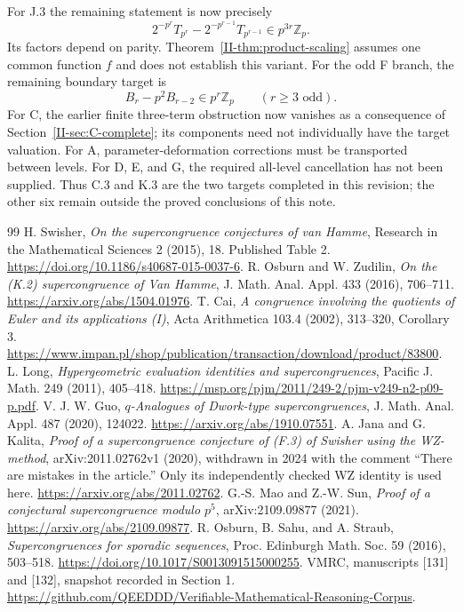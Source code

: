 \documentclass[11pt,letterpaper]{article}
\numberwithin{equation}{section}
\begin{document}
For J.3 the remaining statement is now precisely
\[
2^{-p^r}T_{p^r}-2^{-p^{r-1}}T_{p^{r-1}}
\in p^{3r}\mathbb Z_p.
\]
Its factors depend on parity. Theorem~\ref{II-thm:product-scaling}
assumes one common function $f$ and does not establish this variant.
For the odd F branch, the remaining boundary target is
\[
B_r-p^2B_{r-2}\in p^r\mathbb Z_p\qquad(r\ge3\text{ odd}).
\]
For C, the earlier finite three-term obstruction now vanishes as a
consequence of Section~\ref{II-sec:C-complete}; its components need not
individually have the target valuation.
For A, parameter-deformation corrections must be transported between
levels. For D, E, and G, the required all-level cancellation has not
been supplied. Thus C.3 and K.3 are the two targets completed in this
revision; the other six remain outside the proved conclusions of this note.

\begin{thebibliography}{99}
 H. Swisher, \emph{On the supercongruence conjectures
of van Hamme}, Research in the Mathematical Sciences 2 (2015), 18.
Published Table 2. \url{https://doi.org/10.1186/s40687-015-0037-6}.
 R. Osburn and W. Zudilin, \emph{On the (K.2)
supercongruence of Van Hamme}, J. Math. Anal. Appl. 433 (2016), 706--711.
\url{https://arxiv.org/abs/1504.01976}.
 T. Cai, \emph{A congruence involving the quotients of
Euler and its applications (I)}, Acta Arithmetica 103.4 (2002), 313--320,
Corollary 3. \url{https://www.impan.pl/shop/publication/transaction/download/product/83800}.
 L. Long, \emph{Hypergeometric evaluation identities
and supercongruences}, Pacific J. Math. 249 (2011), 405--418.
\url{https://msp.org/pjm/2011/249-2/pjm-v249-n2-p09-p.pdf}.
 V. J. W. Guo, \emph{$q$-Analogues of Dwork-type
supercongruences}, J. Math. Anal. Appl. 487 (2020), 124022.
\url{https://arxiv.org/abs/1910.07551}.
 A. Jana and G. Kalita, \emph{Proof of a
supercongruence conjecture of (F.3) of Swisher using the WZ-method},
arXiv:2011.02762v1 (2020), withdrawn in 2024 with the comment
``There are mistakes in the article.'' Only its independently checked
WZ identity is used here. \url{https://arxiv.org/abs/2011.02762}.
 G.-S. Mao and Z.-W. Sun,
\emph{Proof of a conjectural supercongruence modulo $p^5$},
arXiv:2109.09877 (2021). \url{https://arxiv.org/abs/2109.09877}.
 R. Osburn, B. Sahu, and A. Straub,
\emph{Supercongruences for sporadic sequences},
Proc. Edinburgh Math. Soc. 59 (2016), 503--518.
\url{https://doi.org/10.1017/S0013091515000255}.
 VMRC, manuscripts [131] and [132], snapshot recorded
in Section 1. \url{https://github.com/QEEDDD/Verifiable-Mathematical-Reasoning-Corpus}.
\end{thebibliography}
\end{document}

